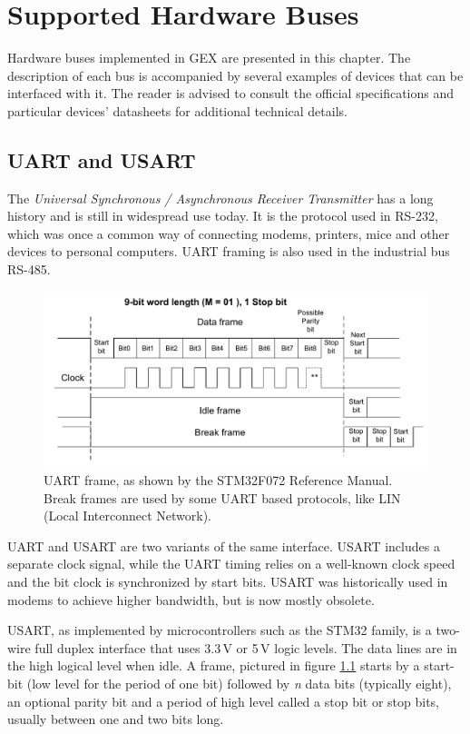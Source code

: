 \chapter{Supported Hardware Buses} \label{ch:hw_buses}

Hardware buses implemented in GEX are presented in this chapter. The description of each bus is accompanied by several examples of devices that can be interfaced with it. The reader is advised to consult the official specifications and particular devices' datasheets for additional technical details.

\section{UART and USART} \label{sec:theory-usart}

The \textit{Universal Synchronous / Asynchronous Receiver Transmitter} has a long history and is still in widespread use today. It is the protocol used in RS-232, which was once a common way of connecting modems, printers, mice and other devices to personal computers. UART framing is also used in the industrial bus RS-485.

\begin{figure}
	\centering
	\includegraphics[width=.8\textwidth] {img/usart.png}
	\caption[UART frame structure]{\label{fig:uart-frame}UART frame, as shown by the STM32F072 Reference Manual. Break frames are used by some UART based protocols, like LIN (Local Interconnect Network).}
\end{figure}

UART and USART are two variants of the same interface. USART includes a separate clock signal, while the UART timing relies on a well-known clock speed and the bit clock is synchronized by start bits. USART was historically used in modems to achieve higher bandwidth, but is now mostly obsolete.

USART, as implemented by microcontrollers such as the STM32 family, is a two-wire full duplex interface that uses 3.3\,V or 5\,V logic levels. The data lines are in the high logical level when idle. A frame, pictured in figure \ref{fig:uart-frame} starts by a start-bit (low level for the period of one bit) followed by \textit{n} data bits (typically eight), an optional parity bit and a period of high level called a stop bit or stop bits, usually between one and two bits long.
 
